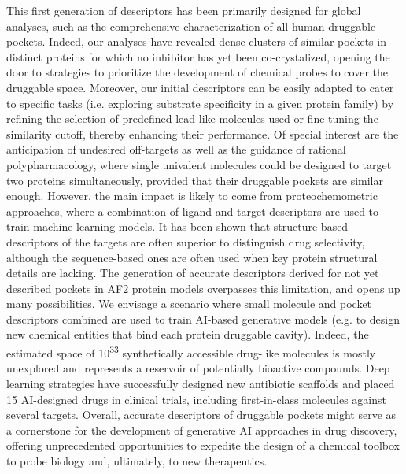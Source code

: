 This first generation of descriptors has been primarily designed for global analyses, such as the comprehensive characterization of all human druggable pockets. Indeed, our analyses have revealed dense clusters of similar pockets in distinct proteins for which no inhibitor has yet been co-crystalized, opening the door to strategies to prioritize the development of chemical probes to cover the druggable space\cite{carter_target_2019}. Moreover, our initial descriptors can be easily adapted to cater to specific tasks (i.e. exploring substrate specificity in a given protein family) by refining the selection of predefined lead-like molecules used or fine-tuning the similarity cutoff, thereby enhancing their performance. Of special interest are the anticipation of undesired off-targets as well as the guidance of rational polypharmacology, where single univalent molecules could be designed to target two proteins simultaneously, provided that their druggable pockets are similar enough\cite{duran-frigola_detecting_2017}. However, the main impact is likely to come from proteochemometric approaches, where a combination of ligand and target descriptors are used to train machine learning models\cite{fernandez-torras_connecting_2022}. It has been shown that structure-based descriptors of the targets are often superior to distinguish drug selectivity, although the sequence-based ones are often used when key protein structural details are lacking\cite{bongers_proteochemometrics_2019}. The generation of accurate descriptors derived for not yet described pockets in AF2 protein models overpasses this limitation, and opens up many possibilities. We envisage a scenario where small molecule and pocket descriptors combined are used to train AI-based generative models (e.g. to design new chemical entities that bind each protein druggable cavity\cite{jin_hierarchical_2020, blaschke_reinvent_2020}). Indeed, the estimated space of 10\textsuperscript{33} synthetically accessible drug-like molecules is mostly unexplored and represents a reservoir of potentially bioactive compounds\cite{polishchuk_estimation_2013}. Deep learning strategies have successfully designed new antibiotic scaffolds\cite{wong_discovery_2024} and placed 15 AI-designed drugs in clinical trials, including first-in-class molecules against several targets\cite{jayatunga_ai_2022}. Overall, accurate descriptors of druggable pockets might serve as a cornerstone for the development of generative AI approaches in drug discovery, offering unprecedented opportunities to expedite the design of a chemical toolbox to probe biology and, ultimately, to new therapeutics.